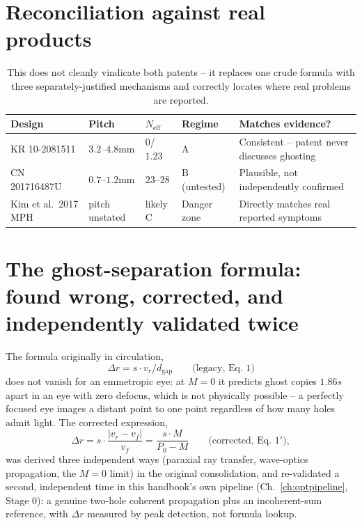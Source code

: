 \documentclass[11pt]{report}
\newcommand{\dgap}{d_{\text{gap}}}
\newcommand{\vr}{v_r}
\newcommand{\vf}{v_f}
\newcommand{\Neff}{N_{\text{eff}}}
\begin{document}
\section{Reconciliation against real products}
\begin{table}[h!]
\centering\small
\begin{tabular}{p{2.6cm}p{2.0cm}p{1.6cm}p{2.4cm}p{4.5cm}}
\toprule
\textbf{Design} & \textbf{Pitch} & $\Neff$ & \textbf{Regime} & \textbf{Matches evidence?} \\
\midrule
KR 10-2081511 & $3.2$--$4.8$mm & $0$/$1.23$ & A & Consistent -- patent never discusses
ghosting \\
CN 201716487U & $0.7$--$1.2$mm & $23$--$28$ & B (untested) & Plausible, not independently
confirmed \\
Kim et al.\ 2017 MPH & pitch unstated & likely C & Danger zone & Directly matches real
reported symptoms \\
\bottomrule
\end{tabular}
\caption{This does not cleanly vindicate both patents -- it replaces one crude formula with
three separately-justified mechanisms and correctly locates where real problems are
reported.}
\end{table}

\section{The ghost-separation formula: found wrong, corrected, and independently validated twice}
\label{sec:deltar}
The formula originally in circulation,
\[
\Delta r = s\cdot \vr/\dgap \qquad \text{(legacy, Eq.~1)}
\]
does not vanish for an emmetropic eye: at $M{=}0$ it predicts ghost copies $1.86s$ apart in
an eye with zero defocus, which is not physically possible -- a perfectly focused eye images
a distant point to one point regardless of how many holes admit light. The corrected
expression,
\[
\Delta r = s\cdot\frac{|\vr-\vf|}{\vf} = \frac{s\cdot M}{P_0-M} \qquad \text{(corrected, Eq.~1$'$)},
\]
was derived three independent ways (paraxial ray transfer, wave-optics propagation, the
$M{=}0$ limit) in the original consolidation, and re-validated a second, independent time in
this handbook's own pipeline (Ch.~\ref{ch:optpipeline}, Stage 0): a genuine two-hole coherent
propagation plus an incoherent-sum reference, with $\Delta r$ measured by peak detection, not
formula lookup.
\end{document}
